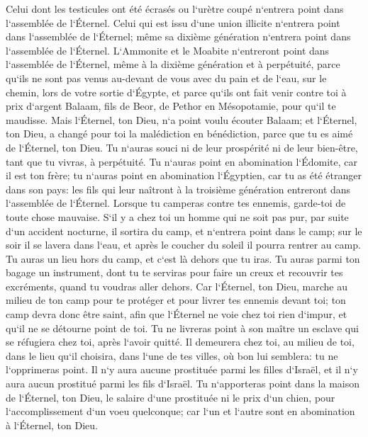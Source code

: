 \verse Celui dont les testicules ont été écrasés ou l`urètre coupé n`entrera point dans l`assemblée de l`Éternel. 
\verse Celui qui est issu d`une union illicite n`entrera point dans l`assemblée de l`Éternel; même sa dixième génération n`entrera point dans l`assemblée de l`Éternel. 
\verse L`Ammonite et le Moabite n`entreront point dans l`assemblée de l`Éternel, même à la dixième génération et à perpétuité, 
\verse parce qu`ils ne sont pas venus au-devant de vous avec du pain et de l`eau, sur le chemin, lors de votre sortie d`Égypte, et parce qu`ils ont fait venir contre toi à prix d`argent Balaam, fils de Beor, de Pethor en Mésopotamie, pour qu`il te maudisse. 
\verse Mais l`Éternel, ton Dieu, n`a point voulu écouter Balaam; et l`Éternel, ton Dieu, a changé pour toi la malédiction en bénédiction, parce que tu es aimé de l`Éternel, ton Dieu. 
\verse Tu n`auras souci ni de leur prospérité ni de leur bien-être, tant que tu vivras, à perpétuité. 
\verse Tu n`auras point en abomination l`Édomite, car il est ton frère; tu n`auras point en abomination l`Égyptien, car tu as été étranger dans son pays: 
\verse les fils qui leur naîtront à la troisième génération entreront dans l`assemblée de l`Éternel. 
\verse Lorsque tu camperas contre tes ennemis, garde-toi de toute chose mauvaise. 
\verse S`il y a chez toi un homme qui ne soit pas pur, par suite d`un accident nocturne, il sortira du camp, et n`entrera point dans le camp; 
\verse sur le soir il se lavera dans l`eau, et après le coucher du soleil il pourra rentrer au camp. 
\verse Tu auras un lieu hors du camp, et c`est là dehors que tu iras. 
\verse Tu auras parmi ton bagage un instrument, dont tu te serviras pour faire un creux et recouvrir tes excréments, quand tu voudras aller dehors. 
\verse Car l`Éternel, ton Dieu, marche au milieu de ton camp pour te protéger et pour livrer tes ennemis devant toi; ton camp devra donc être saint, afin que l`Éternel ne voie chez toi rien d`impur, et qu`il ne se détourne point de toi. 
\verse Tu ne livreras point à son maître un esclave qui se réfugiera chez toi, après l`avoir quitté. 
\verse Il demeurera chez toi, au milieu de toi, dans le lieu qu`il choisira, dans l`une de tes villes, où bon lui semblera: tu ne l`opprimeras point. 
\verse Il n`y aura aucune prostituée parmi les filles d`Israël, et il n`y aura aucun prostitué parmi les fils d`Israël. 
\verse Tu n`apporteras point dans la maison de l`Éternel, ton Dieu, le salaire d`une prostituée ni le prix d`un chien, pour l`accomplissement d`un voeu quelconque; car l`un et l`autre sont en abomination à l`Éternel, ton Dieu. 
